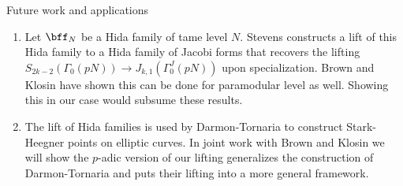 \documentclass[mathserif,12pt]{beamer}
\begin{document}
\begin{frame}{Future work and applications}

\begin{enumerate}  
\item Let $\bff_{N}$ be a Hida family of tame level $N$.  Stevens constructs a lift of this Hida family to a Hida family of Jacobi forms that recovers the lifting $S_{2k-2}(\Gamma_0(pN)) \rightarrow J_{k,1}(\Gamma_0^{J}(pN))$ upon specialization.  Brown and Klosin have shown this can be done for paramodular level as well.  Showing this in our case would subsume these results. \pause
\item  The lift of Hida families is used by Darmon-Tornaria to construct Stark-Heegner points on elliptic curves. In joint work with Brown and Klosin we will show the $p$-adic version of our lifting generalizes the construction of Darmon-Tornaria and puts their lifting into a more general framework.

\end{enumerate}
\end{frame}
\end{document}
